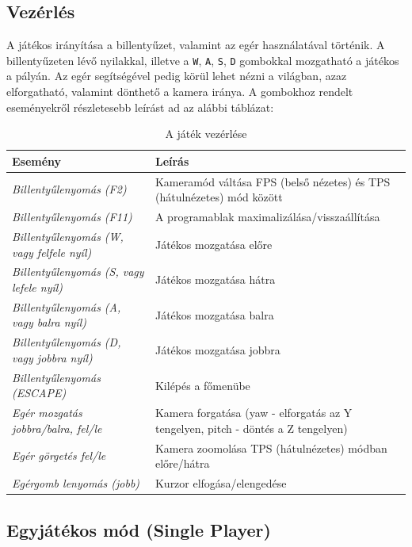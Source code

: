 \subsection{Vezérlés}

A játékos irányítása a billentyűzet, valamint az egér használatával történik. A billentyűzeten lévő nyilakkal, illetve a \verb|W|, \verb|A|, \verb|S|, \verb|D| gombokkal mozgatható a játékos a pályán. Az egér segítségével pedig körül lehet nézni a világban, azaz elforgatható, valamint dönthető a kamera iránya. A gombokhoz rendelt eseményekről részletesebb leírást ad az alábbi táblázat:

\begin{table}[H]
	\centering
	\begin{tabular}{ | m{} | m{} | }
		\hline
		\textbf{Esemény} & \textbf{Leírás} \\
		\hline \hline
		\emph{Billentyűlenyomás (F2)} & Kameramód váltása FPS (belső nézetes) és TPS (hátulnézetes) mód között \\
		\hline
		\emph{Billentyűlenyomás (F11)} & A programablak maximalizálása/visszaállítása \\
		\hline
		\emph{Billentyűlenyomás (W, vagy felfele nyíl)} & Játékos mozgatása előre \\
		\hline
		\emph{Billentyűlenyomás (S, vagy lefele nyíl)} & Játékos mozgatása hátra \\
		\hline
		\emph{Billentyűlenyomás (A, vagy balra nyíl)} & Játékos mozgatása balra \\
		\hline
		\emph{Billentyűlenyomás (D, vagy jobbra nyíl)} & Játékos mozgatása jobbra \\
		\hline
		\emph{Billentyűlenyomás (ESCAPE)} & Kilépés a főmenübe \\
		\hline
		\emph{Egér mozgatás jobbra/balra, fel/le} & Kamera forgatása (yaw - elforgatás az Y tengelyen, pitch - döntés a Z tengelyen) \\
		\hline
		\emph{Egér görgetés fel/le} & Kamera zoomolása TPS (hátulnézetes) módban előre/hátra \\
		\hline
		\emph{Egérgomb lenyomás (jobb)} & Kurzor elfogása/elengedése \\
		\hline
	\end{tabular}
	\caption{A játék vezérlése}
	\label{tab:example-1}
\end{table}

\subsection{Egyjátékos mód (Single Player)}

